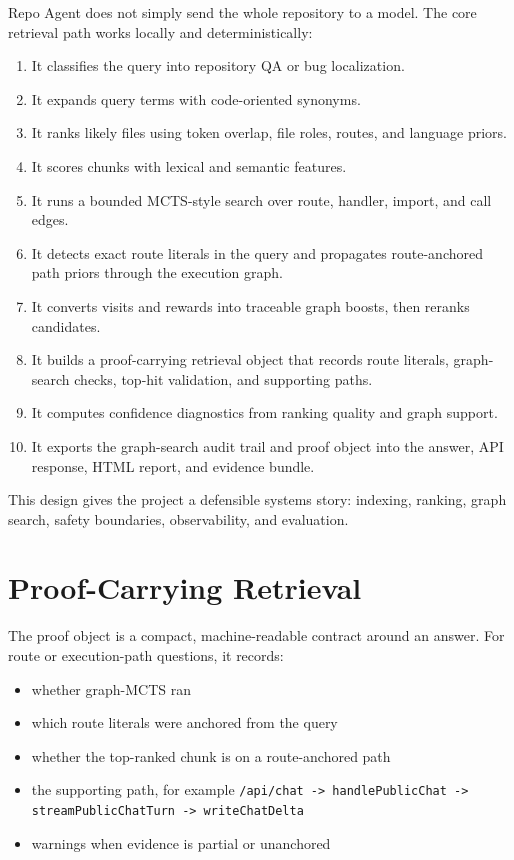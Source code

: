 \documentclass[UTF8,12pt,openany]{ctexbook}
\begin{document}
Repo Agent does not simply send the whole repository to a model. The core retrieval path works locally and deterministically:\par

\begin{enumerate}
\item It classifies the query into repository QA or bug localization.
\item It expands query terms with code-oriented synonyms.
\item It ranks likely files using token overlap, file roles, routes, and language priors.
\item It scores chunks with lexical and semantic features.
\item It runs a bounded MCTS-style search over route, handler, import, and call edges.
\item It detects exact route literals in the query and propagates route-anchored path priors through the execution graph.
\item It converts visits and rewards into traceable graph boosts, then reranks candidates.
\item It builds a proof-carrying retrieval object that records route literals, graph-search checks, top-hit validation, and supporting paths.
\item It computes confidence diagnostics from ranking quality and graph support.
\item It exports the graph-search audit trail and proof object into the answer, API response, HTML report, and evidence bundle.
\end{enumerate}

This design gives the project a defensible systems story: indexing, ranking, graph search, safety boundaries, observability, and evaluation.\par

\section{Proof-Carrying Retrieval}

The proof object is a compact, machine-readable contract around an answer. For route or execution-path questions, it records:\par

\begin{itemize}
\item whether graph-MCTS ran
\item which route literals were anchored from the query
\item whether the top-ranked chunk is on a route-anchored path
\item the supporting path, for example \texttt{/api/chat -> handlePublicChat -> streamPublicChatTurn -> writeChatDelta}
\item warnings when evidence is partial or unanchored
\end{itemize}
\end{document}
